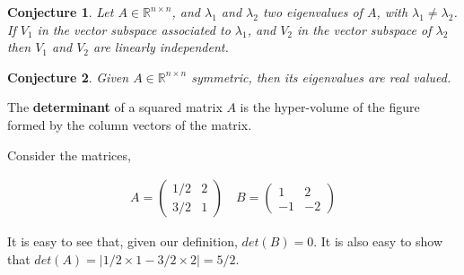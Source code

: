 \documentclass[aspectratio=169]{beamer}
\newtheorem{proposition}{Conjecture}[section]
\begin{document}
\begin{frame}
    \begin{proposition}
        Let $A\in\mathbb{R}^{n\times n}$, and $\lambda_1$ and $\lambda_2$ two eigenvalues of $A$, with $\lambda_1\neq\lambda_2$. If $V_1$ in the vector subspace associated to $\lambda_1$, and $V_2$ in the vector subspace of $\lambda_2$ then $V_1$ and $V_2$ are linearly independent.
    \end{proposition}
    
    \begin{proposition}
        Given $A\in\mathbb{R}^{n\times n}$ symmetric, then its eigenvalues are real valued.
    \end{proposition}
\end{frame}

\begin{frame}
    \begin{definition}
        The \textbf{determinant} of a squared matrix $A$ is the hyper-volume of the figure formed by the column vectors of the matrix.
    \end{definition}
    
    \begin{example}
        Consider the matrices,
        
        \begin{align*}
            A=\left(
            \begin{array}{cc}
                1/2 & 2 \\
                3/2 & 1
            \end{array}
            \right) \quad
            B=\left(
            \begin{array}{cc}
                1 & 2\\
                -1 & -2
            \end{array}
            \right)
        \end{align*}
    \end{example}
    
\end{frame}

\begin{frame}

    \begin{center}
    \end{center}
    
    It is easy to see that, given our definition, $det(B)=0$. It is also easy to show that $det(A)=|1/2\times1-3/2\times2|=5/2$.
    
\end{frame}
\end{document}
